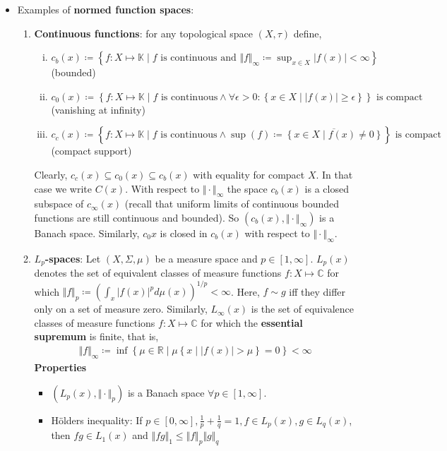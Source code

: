 \documentclass[10pt,a4paper]{article}
\theoremstyle{definition}
\theoremstyle{cor}
\theoremstyle{theorem}
\theoremstyle{lemma}
\theoremstyle{example}
\theoremstyle{remark}
\newcommand{\norm}[1]{\Vert #1 \Vert}
\begin{document}
\begin{itemize}
\item Examples of \textbf{normed function spaces}:
\begin{enumerate}[(1)]
\item \textbf{Continuous functions}: for any topological space $(X, \tau)$ define,
\begin{enumerate}[(i)]
\item $c_b(x) \coloneqq \left\{ f : X \mapsto \mathbb{K} \mid f \text{ is continuous and } \norm{f}_{\infty} \coloneqq \sup_{x \in X} |f(x)| < \infty \right\}$ (bounded)
\item $c_0(x) \coloneqq \left\{ f: X \mapsto \mathbb{K} \mid f \text{ is continuous} \wedge \forall \epsilon > 0: \left\{x\in X \mid |f(x)| \geq \epsilon\right\} \right\} \text{ is compact}$ (vanishing at infinity)
\item $c_c(x) \coloneqq \left\{ f: X \mapsto \mathbb{K} \mid f \text{ is continuous} \wedge \sup(f) \coloneqq \overline{\left\{x\in X \mid f(x) \neq 0 \right\}}\right\} \text{ is compact}$ (compact support)
\end{enumerate}
Clearly, $c_c(x) \subseteq c_0(x) \subseteq c_b(x)$ with equality for compact $X$. In that case we write $C(x)$. With respect to $\norm{\cdot}_{\infty}$ the space $c_b(x)$ is a closed subspace of $c_{\infty}(x)$ (recall that uniform limits of continuous bounded functions are still continuous and bounded). So $(c_b(x), \norm{\cdot}_{\infty})$ is a Banach space. Similarly, $c_0{x}$ is closed in $c_b(x)$ with respect to $\norm{\cdot}_{\infty}$.
\item \textbf{$L_p$-spaces}: Let $(X, \Sigma, \mu)$ be a measure space and $p\in [1, \infty]$. $L_p(x)$ denotes the set of equivalent classes of measure functions $f: X \mapsto \mathbb{C}$ for which $\norm{f}_p \coloneqq \left(\int_{x} |f(x)|^p d\mu(x)\right)^{1/p} < \infty$. Here, $f\sim g$ iff they differ only on a set of measure zero. Similarly, $L_{\infty}(x)$ is the set of equivalence classes of measure functions $f: X \mapsto \mathbb{C}$ for which the \textbf{essential supremum} is finite, that is, 
\begin{align*}
\norm{f}_{\infty} \coloneqq \inf\left\{ \mu\in\mathbb{R} \mid \mu\left\{ x \mid |f(x)| > \mu\right\} = 0 \right\} < \infty
\end{align*}
\textbf{Properties}
\begin{itemize}
\item $\left(L_p(x), \norm{\cdot}_{p}\right)$ is a Banach space $\forall p \in [1, \infty]$. 
\item H\"{o}lders inequality: If $p\in[0,\infty], \frac{1}{p} + \frac{1}{q} = 1, f\in L_p(x), g\in L_q(x)$, then $fg\in L_1(x)$ and $\norm{fg}_1 \leq \norm{f}_p \norm{g}_q$

\end{itemize}
\end{enumerate}
\end{itemize}
\end{document}
